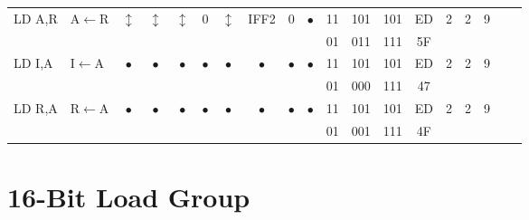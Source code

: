 \documentclass[oneside,a4paper]{book}
\begin{document}
{\begin{tabular}{llc@{ }c@{ }c@{ }c@{ }c@{ }c@{ }c@{ }cc@{ }c@{ }cccccll}
LD A,R & A$\leftarrow$R & 
	$\updownarrow$ & $\updownarrow$ & $\updownarrow$ & 0 & $\updownarrow$ & IFF2 & 0 & $\bullet$ & 11 & 101 & 101 
	& ED & 2 & 2 & 9 & & \\ 
\multicolumn{10}{c}{} & 01 & 011 & 111 & 5F & \multicolumn{3}{c}{} & & \\

LD I,A & I$\leftarrow$A & 
	$\bullet$ & $\bullet$ & $\bullet$ & $\bullet$ & $\bullet$ & $\bullet$ & $\bullet$ & $\bullet$ & 11 & 101 & 101
	& ED & 2 & 2 & 9 & & \\ 
\multicolumn{10}{c}{} & 01 & 000 & 111 & 47 & \multicolumn{3}{c}{} & & \\

LD R,A & R$\leftarrow$A & 
	$\bullet$ & $\bullet$ & $\bullet$ & $\bullet$ & $\bullet$ & $\bullet$ & $\bullet$ & $\bullet$ & 11 & 101 & 101
	& ED & 2 & 2 & 9 & & \\ 
\multicolumn{10}{c}{} & 01 & 001 & 111 & 4F & \multicolumn{3}{c}{} & & \\ \hline

\end{tabular}
}

\section{16-Bit Load Group}
\end{document}
